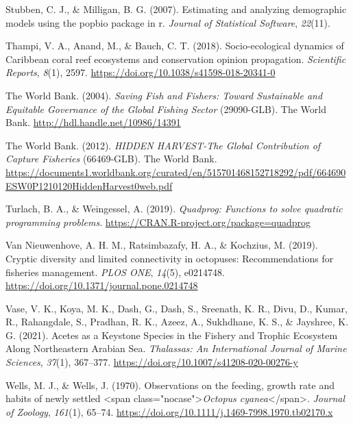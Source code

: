 \documentclass[
]{article}
\newlength{\cslhangindent}
\newlength{\cslentryspacingunit} %
\newenvironment{CSLReferences}[2] %
 {%
  \setlength{\parindent}{0pt}
  \ifodd #1
  \let\oldpar\par
  \def\par{\hangindent=\cslhangindent\oldpar}
  \fi
  \setlength{\parskip}{#2\cslentryspacingunit}
 }%
 {}
\begin{document}
\begin{CSLReferences}{1}{2}
\leavevmode{}%
Stubben, C. J., \& Milligan, B. G. (2007). Estimating and analyzing demographic models using the popbio package in r. \emph{Journal of Statistical Software}, \emph{22}(11).

\leavevmode{}%
Thampi, V. A., Anand, M., \& Bauch, C. T. (2018). Socio-ecological dynamics of {Caribbean} coral reef ecosystems and conservation opinion propagation. \emph{Scientific Reports}, \emph{8}(1), 2597. \url{https://doi.org/10.1038/s41598-018-20341-0}

\leavevmode{}%
The World Bank. (2004). \emph{Saving {Fish} and {Fishers}: {Toward} {Sustainable} and {Equitable} {Governance} of the {Global} {Fishing} {Sector}} (29090-GLB). The World Bank. \url{http://hdl.handle.net/10986/14391}

\leavevmode{}%
The World Bank. (2012). \emph{{HIDDEN} {HARVEST}-{The} {Global} {Contribution} of {Capture} {Fisheries}} (66469-GLB). The World Bank. \url{https://documents1.worldbank.org/curated/en/515701468152718292/pdf/664690ESW0P1210120HiddenHarvest0web.pdf}

\leavevmode{}%
Turlach, B. A., \& Weingessel, A. (2019). \emph{Quadprog: Functions to solve quadratic programming problems}. \url{https://CRAN.R-project.org/package=quadprog}

\leavevmode{}%
Van Nieuwenhove, A. H. M., Ratsimbazafy, H. A., \& Kochzius, M. (2019). Cryptic diversity and limited connectivity in octopuses: {Recommendations} for fisheries management. \emph{PLOS ONE}, \emph{14}(5), e0214748. \url{https://doi.org/10.1371/journal.pone.0214748}

\leavevmode{}%
Vase, V. K., Koya, M. K., Dash, G., Dash, S., Sreenath, K. R., Divu, D., Kumar, R., Rahangdale, S., Pradhan, R. K., Azeez, A., Sukhdhane, K. S., \& Jayshree, K. G. (2021). Acetes as a {Keystone} {Species} in the {Fishery} and {Trophic} {Ecosystem} {Along} {Northeastern} {Arabian} {Sea}. \emph{Thalassas: An International Journal of Marine Sciences}, \emph{37}(1), 367--377. \url{https://doi.org/10.1007/s41208-020-00276-y}

\leavevmode{}%
Wells, M. J., \& Wells, J. (1970). Observations on the feeding, growth rate and habits of newly settled {\textless{}}span class="nocase"{\textgreater{}}\emph{{Octopus} cyanea}{\textless{}}/span{\textgreater{}}. \emph{Journal of Zoology}, \emph{161}(1), 65--74. \url{https://doi.org/10.1111/j.1469-7998.1970.tb02170.x}


\end{CSLReferences}
\end{document}
